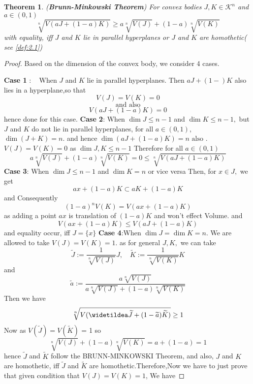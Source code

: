 \documentclass[oneside]{book}
\newtheorem{theorem}{Theorem}[section]
\begin{document}
 \begin{theorem}(\textbf{Brunn-Minkowski Theorem})
 \label{thm:20}
For convex bodies $J, K \in \mathcal{K}^{n}$ and $a \in(0,1)$
\begin{equation}
\label{eq54}
\sqrt[n]{V(a J+(1-a) K)} \geq a \sqrt[n]{V(J)}+(1-a) \sqrt[n]{V(K)}
\end{equation} \label{eq:4.19}
with equality, iff $J$ and $K$ lie in parallel hyperplanes or $J$ and $K$ are homothetic( see \ref{def:2.1})
  \end{theorem}
\begin{proof}
Based on the dimension of the convex body, we consider 4 cases.
 \hfill \break
 
\textbf{Case 1} $: \quad \text{When } J$ and $K$ lie in parallel hyperplanes. Then  $a J+(1-) K$  also lies in a hyperplane,\quad so that $$V(J)=V(K)=0$$    $$\text{and also}$$ $$V(a J+(1-a) K)=0$$
 hence done for this case.
 \hfill \break
\textbf{Case 2}: \quad  When $\operatorname{dim} J \leq n-1$ and $\operatorname{dim} K \leq n-1,$ but $J$ and $K$ do not lie in parallel hyperplanes, for all $a \in(0,1)$, $\operatorname{dim}(J+K)=n .$ and hence  $\operatorname{dim}(a J+(1-a) K)=n \text{ also }.$ 
\hfill \break
$V(J) = V(K)= 0$ as $\operatorname{dim} J,K \leq n-1 $ Therefore for all $a \in(0,1)$
 $$
a \sqrt[n]{V(J)}+(1-a) \sqrt[n]{V(K)}=0 \leq \sqrt[n]{V(a J+(1-a) K)}
$$
\hfill \break
\textbf{Case 3}: \quad  When $\operatorname{dim } J \leq n-1$ and $\operatorname{dim} K=n$ or vice versa
\hfill \break 
Then, for $x \in J,$ we get
\[
a x+(1-a) K \subset a K+(1-a) K
\]
and Consequently
\[
(1-a)^{n} V(K)=V(a x+(1-a) K) 
\]
as adding a point $a x $ is translation of $(1-a) K$ and won't effect Volume. 
and
$$ V(a x+(1-a) K) \leq V(a 
J+(1-a) K)$$
and equality occur, iff $J=\{x\}$ 
\hfill \break
\textbf{Case 4}:When $\operatorname{dim} J=\operatorname{dim} K=n .$  We are allowed to take $V(J)=V(K)=1 .$ as for general $J, K,$  we  can take
\[
  \widetilde{J}:=\frac{1}{\sqrt[n]{V(J)}} J, \quad \widetilde{K}:=\frac{1}{\sqrt[n]{V(K)}} K
\]
and
\[
\widetilde{a}:=\frac{a \sqrt[n]{V(J)}}{a \sqrt[n]{V(J)}+(1-a) \sqrt[n]{V(K)}}
\]
Then we have
\[
    \sqrt[n]{V({\widetildea \widetilde{ J} }+(1-\widetilde{a}) \widetilde{K})} \geq 1
\]
Now  as $V(\widetilde{J}) = V(\widetilde{K})$ = 1 so $$\sqrt[n]{V(J)}+(1-a) \sqrt[n]{V(K)}=a+(1-a)=1$$
hence $\widetilde{J}$ and $\widetilde{K}$
follow the BRUNN-MINKOWSKI Theorem,  and also, $J$ and $K$ are homothetic, iff $\widetilde{J}$ and $\widetilde{K}$ are homothetic.Therefore,Now  we have to just prove that given condition that $V(J)=V(K)=1$, We have 

\end{proof}
\end{document}
